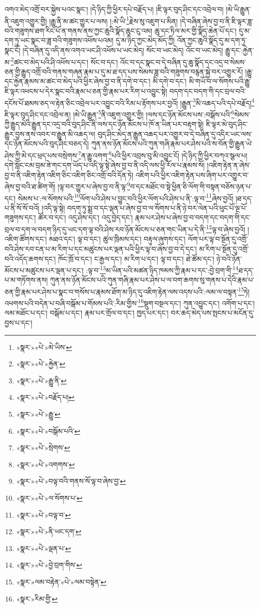 འགའ་མེད་འགྲོ་བར་སྐྱེས་པའང་སྣང་། །དེ་ཉིད་ཀྱི་ཕྱིར་དཔེ་བརྗོད་པ། །ཇི་ལྟར་བུད་ཤིང་དང་འབྲེལ་བ། །མེ་ཡི་རྒྱུན་ནི་འཇུག་འགྱུར་གྱི། །རྒྱུ་ནི་མ་ཚང་གྱུར་པ་ལས། །:མེ་ཡི་\footnote{«སྣར་»«པེ་»མེ་ཡིས་}རྗེས་སུ་འཇུག་པ་མིན། །དེ་བཞིན་ཞེས་བྱ་བ་ནི་ཇི་ལྟར་ཟླ་བའི་གཟུགས་ཐག་རིང་པོ་ན་གནས་ནས་ཀྱང་ཆུའི་སྣོད་ཆུང་ངུ་འམ། ཆུ་དང་ཏིལ་མར་གྱི་སྣོད་ཆེན་པོ་དང་། དུ་མ་དག་ཏུ་ཡང་སྣང་བ་ཟླ་བའི་གཟུགས་འཕོས་པའམ། དུ་མ་ཉིད་ཀྱང་མེད་མོད་ཀྱི། འོན་ཀྱང་ཆུའི་སྣོད་དུ་མ་དག་ཏུ་སྣང་ངོ། །དེ་བཞིན་དུ་འདི་ནས་འགའ་ཡང་ཤི་འཕོས་པ་ཡང་མེད། སོང་བ་ཡང་མེད། འོང་བ་ཡང་མེད། རྒྱུ་དང་:རྐྱེན་མ་\footnote{«སྣར་»«པེ་»རྐྱེན་}ཚང་བ་མེད་པའི་ཤི་འཕོས་པ་དང་། སོང་བ་དང་། འོང་བ་དང་སྣང་བ་དེ་བཞིན་དུ་ཆུ་སྣོད་དང་འདྲ་བ་སེམས་ཅན་གྱི་རྒྱུད་འགྲོ་བའི་གནས་གཞན་རྣམ་པ་དུ་མ་ཐ་དད་པས་སེམས་ཟླ་བའི་གཟུགས་བརྙན་སྐྱེ་བར་འགྱུར་རོ། །རྒྱུ་དང་རྐྱེན་རྣམས་མ་ཚང་བ་མེད་པའི་ཕྱིར་ཞེས་བྱ་བ་ནི་དགེ་བ་དང་། མི་དགེ་བ་དང་། མི་གཡོ་བ་ལ་སོགས་པའི་རྒྱུ་ཇི་ལྟར་འཕངས་པ་དེར་སྣང་བའི་རྣམ་པ་ཅན་གྱི་རྣམ་པར་རིག་པ་འབྱུང་སྟེ། བདག་དང་བདག་གི་དང་བྲལ་བའི་དངོས་པོ་ཐམས་ཅད་ལ་རྟེན་ཅིང་འབྲེལ་པར་འབྱུང་བའི་རིམ་པ་རྟོགས་པར་བྱའོ། །རྒྱུན་\footnote{«སྣར་»«པེ་»རྒྱུ་ནི་}མི་འཆད་པའི་དཔེ་བརྗོད།\footnote{«སྣར་»«པེ་»བརྗོད་པ།} ཇི་ལྟར་བུད་ཤིང་དང་འབྲེལ་ན། །མེ་ཡི་རྒྱུན་\footnote{«སྣར་»«པེ་»རྒྱུ་}ནི་འཇུག་འགྱུར་གྱི། །ལས་དང་ཉོན་མོངས་པས་:བསྒོས་པའི་\footnote{«སྣར་»«པེ་»བསྒོམ་པའི་}སེམས་ཀྱི་རྒྱུད་མེའི་རྒྱུན་དང་འདྲ་བའི་བུད་ཤིང་ནི་ལས་དང་ཉོན་མོངས་པ་ཁོ་ན་ཡིན་པར་བརྟག་སྟེ། ཇི་ལྟར་མེ་བུད་ཤིང་རྒྱུར་བྱས་ནས་འབར་བ་རྒྱུན་མི་འཆད་ལ། བུད་ཤིང་མེད་ན་རྒྱུན་འཆད་པར་འགྱུར་བ་དེ་བཞིན་དུ་འདིར་ཡང་ལས་དང་ཉོན་མོངས་པའི་བུད་ཤིང་བཅད་དེ། ཀུན་ནས་ཉོན་མོངས་པའི་ཀུན་གཞི་རྣམ་པར་ཤེས་པའི་ས་བོན་གྱི་རྒྱུན་ཡེ་ཤེས་ཀྱི་མེ་དང་ཕྲད་པས་བསྲེགས་\footnote{«སྣར་»«པེ་»སྲེགས་}ན་རྒྱུ་འགག་\footnote{«སྣར་»«པེ་»འགགས་}པའི་ཕྱིར་འབྲས་བུ་མི་འབྱུང་ངོ། །དེ་ཉིད་ཀྱི་ཕྱིར་བཀའ་སྩལ་པ། དགེ་སློང་ངམ་བྲམ་ཟེ་གང་དག་ཡོད་པ་འདི་ལྟ་སྟེ་ཞེས་བྱ་བ་ནི་འདི་ལས་ཕྱི་རོལ་པ་རྣམས་སོ། །འཇིག་རྟེན་ན་ཞེས་བྱ་བ་ནི་འཇིག་རྟེན་འཇིག་ཅིང་འཇིག་ཅིང་འགྲོ་བའི་དོན་ཏེ། འཇིག་པའི་ཕྱིར་འཇིག་རྟེན་པས་ཞིག་པར་འགྱུར་བ་ཞེས་བྱ་བའི་ཐ་ཚིག་གོ། །ལྟ་བར་གྱུར་པ་ཞེས་བྱ་བ་ནི་ལྟ་\footnote{«སྣར་»«པེ་»བལྟ་བའི་གནས་སོ་ལྟ་བ་ཞེས་བྱ་}བ་དང་མཐོང་བ་སྟེ་ཕྱིན་ཅི་ལོག་གི་བསྟན་བཅོས་ཉན་པ་དང་། སེམས་པ་:ལ་སོགས་པའི་\footnote{«སྣར་»«པེ་»ལ་སོགས་པ་}ལོག་པའི་ཤེས་པ་བྱུང་བའི་ཕྱིར་ལོག་པའི་ཤེས་པ་ནི་:ལྟ་བ་\footnote{«སྣར་»«པེ་»བལྟ་བ་}ཞེས་བྱའོ། །ཐ་དད་པ་ནི་སོ་སོ་བའོ། །འདི་ལྟ་སྟེ། བདག་ཏུ་སྨྲ་བ་དང་ལྡན་པ་ཞེས་བྱ་བ་ལ་སོགས་པ་ནི་ཉེ་བར་ལེན་པའི་ཕུང་པོ་ལྔ་པོ་གཟུགས་དང་། ཚོར་བ་དང་། འདུ་ཤེས་དང་། འདུ་བྱེད་དང་། རྣམ་པར་ཤེས་པ་ཞེས་བྱ་བ་བདག་དང་བདག་གི་དང་བྲལ་བ་དག་ལ་བདག་ཉིད་དུ་ཡང་དག་ལྟ་བའི་ཤེས་རབ་ཉོན་མོངས་པ་ཅན་གང་ཡིན་པ་དེ་ནི་\footnote{«སྣར་»«པེ་»ནི་ཡང་དག་}ལྟ་བ་ཞེས་བྱའོ། །འཇིག་ཚོགས་དང་། མཐའ་དང་། ལྟ་བ་དང་། ཚུལ་ཁྲིམས་དང་། བརྟུལ་ཞུགས་དང་། ལོག་པར་ལྟ་བ་སྔོན་དུ་འགྲོ་བའི་ཤེས་རབ་ངན་པ་མ་རིག་པ་དང་མཚུངས་པར་ལྡན་པའི་ཕྱིར་ལྟ་བ་ཞེས་བྱ་བ་དེ་དང་། མ་རིག་པ་སྔོན་དུ་འགྲོ་བའི་འདོད་ཆགས་དང་། ཁོང་ཁྲོ་བ་དང་། ང་རྒྱལ་དང་། མ་རིག་པ་དང་། ལྟ་བ་དང་། ཐེ་ཚོམ་དང་། ཉེ་བའི་ཉོན་མོངས་པ་མཚུངས་པར་ལྡན་པ་དང་། :ལྟ་བ་\footnote{«སྣར་»«པེ་»ལྡན་པ་}མ་ཡིན་པའི་མཚན་ཉིད་ཁམས་ཀྱི་རྣམ་པ་དང་:བྱེ་བྲག་གི་\footnote{«སྣར་»«པེ་»བྱེ་བྲག་གིས་}ཐ་དད་པ་མ་གཏོགས་ནས། ཀུན་ནས་ཉོན་མོངས་པའི་ཀུན་གཞི་རྣམ་པར་ཤེས་པ་ལ་བག་ཆགས་སུ་གནས་པ་དེའི་རྣམ་པ་ཅན་གྱི་རྣམ་པར་ཤེས་པ་སྣང་བ་གསོས་པ་རྣམས་ཐོག་མ་ཉིད་དུ་འཇིག་རྟེན་ལས་འདས་པའི་:ལམ་ལ་བསྟན་\footnote{«སྣར་»ལམ་བརྟེན་«པེ་»ལམ་བསྟེན་}ཏེ། འཕགས་པའི་བདེན་པ་བཞི་བསྒོམ་པ་གོམས་པའི་:རིམ་གྱིས་\footnote{«སྣར་»རིམ་གྱི་}སྡུག་བསྔལ་དང་། ཀུན་འབྱུང་དང་། འགོག་པ་དང་། ལམ་མཐོང་པ་དང་། བསྒོམ་པ་དང་། རྣམ་པར་གྲོལ་བ་དང་། ཁྱད་པར་དང་། བར་ཆད་མེད་པས་སྤངས་པ་མངོན་དུ་བྱས་པ་དང་། 